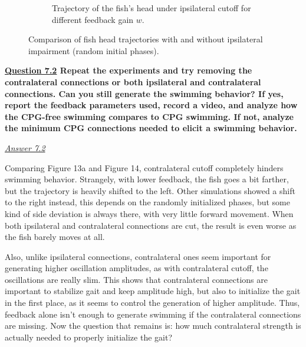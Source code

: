 \documentclass{cmc}
\begin{document}
\begin{figure}[H]
\begin{subfigure}[t]{0.48\linewidth}
        \caption{Trajectory of the fish's head under ipsilateral cutoff for different feedback gain $w$.}
        \label{fig:ipsi_cutoff_random}
    \end{subfigure}
    \caption{Comparison of fish head trajectories with and without ipsilateral impairment (random initial phases).}
    
\end{figure}

\textbf{\underline{Question 7.2} Repeat the experiments and try removing the contralateral connections or both ipsilateral and contralateral connections. Can you still generate the swimming behavior? If yes, report the feedback parameters used, record a video, and analyze how the CPG-free swimming compares to CPG swimming. If not, analyze the minimum CPG connections needed to elicit a swimming behavior.
}

\textit{\underline{Answer 7.2}}

Comparing Figure 13a and Figure 14, contralateral cutoff completely hinders swimming behavior. Strangely, with lower feedback, the fish goes a bit farther, but the trajectory is heavily shifted to the left. Other simulations showed a shift to the right instead, this depends on the randomly initialized phases, but some kind of side deviation is always there, with very little forward movement. When both ipsilateral and contralateral connections are cut, the result is even worse as the fish barely moves at all.

Also, unlike ipsilateral connections, contralateral ones seem important for generating higher oscillation amplitudes, as with contralateral cutoff, the oscillations are really slim. This shows that contralateral connections are important to stabilize gait and keep amplitude high, but also to initialize the gait in the first place, as it seems to control the generation of higher amplitude. Thus, feedback alone isn't enough to generate swimming if the contralateral connections are missing. Now the question that remains is: how much contralateral strength is actually needed to properly initialize the gait?
\end{document}
